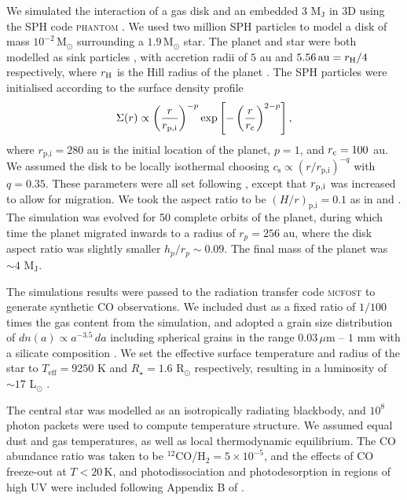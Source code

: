 We simulated the interaction of a gas disk and an embedded 3 M$_\textrm{J}$ in 3D using the SPH code \textsc{phantom} \citep{price2018}.
We used two million SPH particles to model a disk of mass $10^{-2} \, \mathrm{M_\odot}$ surrounding a $1.9 \, \mathrm{M_\odot}$ star.
The planet and star were both modelled as sink particles \citep{bate1995}, with accretion radii of $5$ au and $5.56 \, \mathrm{au} = r_{\rm H}/4$ respectively, where $r_{\rm H}$ is the Hill radius of the planet \citep{hill1878}.
The SPH particles were initialised according to the surface density profile
\begin{align}
    \Sigma (r) \propto \left(\frac{r}{r_\mathrm{p,i}}\right)^{-p} \exp \left[-\left(\frac{r}{r_{\rm c}}\right)^{2-p}\right], \label{eq:power_law_wake}
\end{align}
where $r_\textrm{p,i} = 280$ au is the initial location of the planet, $p = 1$, and  $r_{\rm c} = 100 $ au.
We assumed the disk to be locally isothermal choosing $c_\textrm{s} \propto (r/r_\textrm{p,i})^{-q}$ with $q = 0.35$.
These parameters were all set following \citet{pinte2018a}, except that $r_{\rm p,i}$ was increased to allow for migration.
We took the aspect ratio to be $(H/r)_{\textrm{p,i}} = 0.1$ as in \citet{degregorio-monsalvo2013} and \citet{pinte2018a}.
The simulation was evolved for 50 complete orbits of the planet, during which time the planet migrated inwards to a radius of $r_p = 256$ au, where the disk aspect ratio was slightly smaller $h_p/r_p \sim 0.09$.
The final mass of the planet was $\sim 4$ $\mathrm{M_J}$.

The simulations results were passed to the radiation transfer code \textsc{mcfost} \citep{pinte2006,pinte2009} to generate synthetic CO observations.
We included dust as a fixed ratio of $1/100$ times the gas content from the simulation, and adopted a grain size distribution of $dn(a) \propto a^{-3.5} \, da$ including spherical grains in the range  $0.03 \, \mu$m -- $1$ mm with a silicate composition \citep{weingartner2001}.
We set the effective surface temperature and radius of the star to $T_\textrm{eff} = 9250$ K and $R_\star = 1.6 $ $\mathrm{R_\odot}$ respectively, resulting in a luminosity of $\sim 17$ L$_\odot$ \citep{setterholm2018}.

The central star was modelled as an isotropically radiating blackbody, and $10^8$ photon packets were used to compute temperature structure.
We assumed equal dust and gas temperatures, as well as local thermodynamic equilibrium.
The CO abundance ratio was taken to be $^{12}$CO/H$_2 = 5\times 10^{-5}$, and the effects of CO freeze-out at $T < 20\, \mathrm{K}$, and photodissociation and photodesorption in regions of high UV were included following Appendix B of \citet{pinte2018}.

